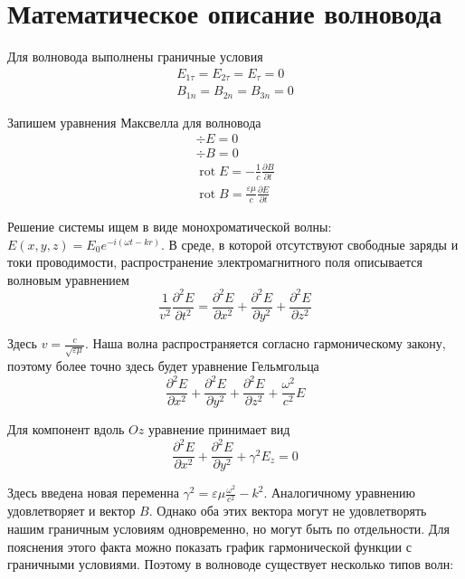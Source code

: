 \documentclass[a4paper, 14pt]{article}
\newcommand{\rot}{\mathop{\mathrm{rot}} \nolimits}
\begin{document}
    \section*{Математическое описание волновода} 
    
    Для волновода выполнены граничные условия
    \begin{gather*}
        E_{1\tau} = E_{2\tau} = E_\tau = 0 \\
        B_{1n} = B_{2n} = B_{3n} = 0
    \end{gather*}
    
    Запишем уравнения Максвелла для волновода
    \begin{gather*}
        \div E = 0 \\
        \div B = 0 \\
        \rot E = - \frac{1}{c} \frac{\partial B}{\partial t} \\
        \rot B = \frac{\varepsilon \mu}{c} \frac{\partial E}{\partial t}
    \end{gather*}
    
    Решение системы ищем в виде монохроматической волны: $E(x, y, z) = E_0 e^{-i(\omega t - kr)}$.
    В среде, в которой отсутствуют свободные заряды и токи проводимости, распространение электромагнитного поля
    описывается волновым уравнением
    \[ \frac{1}{v^2} \frac{\partial^2 E}{\partial t^2} = \frac{\partial^2 E}{\partial x^2} + \frac{\partial^2 E}
    {\partial y^2} + \frac{\partial^2 E}{\partial z^2} \]
    
    Здесь $v = \frac{c}{\sqrt{\varepsilon \mu}}$.
    Наша волна распространяется согласно гармоническому закону, поэтому более точно здесь будет уравнение Гельмгольца
    \[ \frac{\partial^2 E}{\partial x^2} + \frac{\partial^2 E}{\partial y^2} + \frac{\partial^2 E}{\partial z^2} +
    \frac{\omega^2}{c^2} E \]
    
    Для компонент вдоль $Oz$ уравнение принимает вид
    \[ \frac{\partial^2 E}{\partial x^2} + \frac{\partial^2 E}{\partial y^2} + \gamma^2 E_z = 0 \]
    
    Здесь введена новая переменна $\gamma^2 = \varepsilon \mu \frac{\omega^2}{c^2} - k^2$.
    Аналогичному уравнению удовлетворяет и вектор $B$.
    Однако оба этих вектора могут не удовлетворять нашим граничным условиям одновременно, но могут быть по отдельности.
    Для пояснения этого факта можно показать график гармонической функции с граничными условиями.
    Поэтому в волноводе существует несколько типов волн:
    
\end{document}
